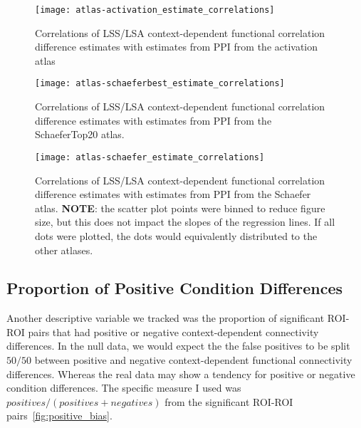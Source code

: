 \documentclass[phd,figures,tables,ackpage,abstractpage,publicabstractpage]{uithesis}
\begin{document}
\begin{figure}[H]
  \centering
  \texttt{[image: atlas-activation\_estimate\_correlations]}
  \caption[Correlation between LSA/LSS and PPI in the activation atlas]{
    Correlations of LSS/LSA context-dependent functional correlation difference estimates with
    estimates from PPI from the activation atlas
  }
  \label{fig:atlas-activation_correlations}
\end{figure}

\begin{figure}[H]
  \centering
  \texttt{[image: atlas-schaeferbest\_estimate\_correlations]}
  \caption[Correlation between LSA/LSS and PPI in the SchaeferTop20 atlas]{
    Correlations of LSS/LSA context-dependent functional correlation difference estimates with
    estimates from PPI from the SchaeferTop20 atlas.
  }
  \label{fig:atlas-schaeferbest_correlations}
\end{figure}

\begin{figure}[H]
  \centering
  \texttt{[image: atlas-schaefer\_estimate\_correlations]}
  \caption[Correlation between LSA/LSS and PPI in the Schaefer atlas]{
    Correlations of LSS/LSA context-dependent functional correlation difference estimates with
    estimates from PPI from the Schaefer atlas.
    \textbf{NOTE}: the scatter plot points were binned to reduce figure size, but
    this does not impact the slopes of the regression lines.
    If all dots were plotted, the dots would equivalently 
    distributed to the other atlases.
  }
  \label{fig:atlas-schaefer_correlations}
\end{figure}

\subsection{Proportion of Positive Condition Differences}

Another descriptive variable we tracked was the proportion of significant ROI-ROI pairs
that had positive or negative context-dependent connectivity differences.
In the null data, we would expect the the false positives to be split $50/50$ between
positive and negative context-dependent functional connectivity differences.
Whereas the real data may show a tendency for positive or negative condition differences.
The specific measure I used was $positives / (positives + negatives)$
from the significant ROI-ROI pairs~\ref{fig:positive_bias}.
\end{document}
